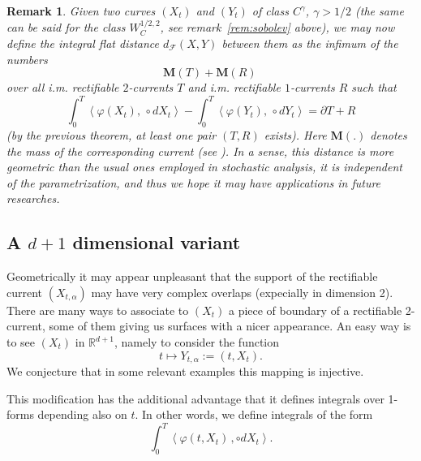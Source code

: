 \documentclass{article}
\newtheorem{remark}[theorem]{Remark}
\begin{document}
\begin{remark}
Given two curves $\left( X_{t}\right) $ and $\left( Y_{t}\right) $ of class 
$C^{\gamma }$, $\gamma >1/2$ (the same can be said for the class $%
W_{C}^{1/2,2}$, see remark~\ref{rem:sobolev} above), we may now define the \emph{integral
flat distance} $d_{\mathcal{F}}\left( X,Y\right) $ between them as the
infimum of the numbers 
\begin{equation*}
\mathbf{M}\left( T\right) +\mathbf{M}\left( R\right) \,
\end{equation*}
over all i.m. rectifiable $2$-currents $T$ and i.m. rectifiable $1$-currents 
$R$ such that 
\begin{equation*}
\int_{0}^{T}\left\langle \varphi \left( X_{t}\right) ,\,\circ
dX_{t}\right\rangle -\int_{0}^{T}\left\langle \varphi \left( Y_{t}\right)
,\,\circ dY_{t}\right\rangle =\partial T+R
\end{equation*}
(by the previous theorem, at least one pair $\left( T,R\right) $ exists).
Here $\mathbf{M}\left( .\right) $ denotes the mass of the corresponding
current (see \cite{GMS}). In a sense, this distance is more geometric than
the usual ones employed in stochastic analysis, it is independent of the
parametrization, and thus we hope it may have applications in future
researches.
\end{remark}

\subsection{A $d+1$ dimensional variant}

Geometrically it may appear unpleasant that the support of the rectifiable
current $\left( X_{t,\alpha }\right) $ may have very complex overlaps
(expecially in dimension 2). There are many ways to associate to $\left(
X_{t}\right) $ a piece of boundary of a rectifiable 2-current, some of them
giving us surfaces with a nicer appearance. An easy way is to see $\left(
X_{t}\right) $ in $\mathbb{R}^{d+1}$, namely to consider the function 
\begin{equation*}
t\mapsto Y_{t,\alpha }:=\left( t,X_{t}\right) \text{.}
\end{equation*}
We conjecture that in some relevant examples this mapping is injective.

This modification has the additional advantage that it defines integrals
over 1-forms depending also on $t$. In other words, we define integrals of
the form 
\begin{equation*}
\int_{0}^{T}\left\langle \varphi \left( t,X_{t}\right) \,,\circ
dX_{t}\right\rangle .
\end{equation*}
\end{document}
